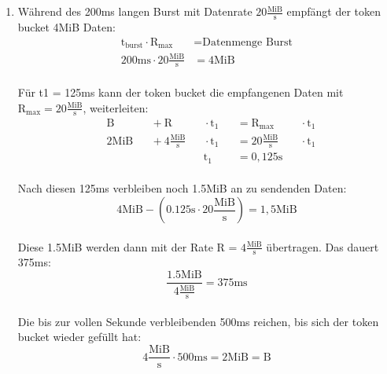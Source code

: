 \documentclass[a4paper,
			llpt,
			solution,
			accentcolor=tud2d,
			colorbacktitle
			]
			{tudexercise}
\newcommand{\MiBs}{\frac{\mathrm{MiB}}{\mathrm{s}}}
\begin{document}
\section{}
\begin{enumerate}
\item
\begin{multicols}{2}
Während des 200ms langen Burst mit Datenrate $20\MiBs$ empfängt der token bucket 4MiB Daten: 
\begin{align*}
\text{t}_\text{burst}  \cdot \text{R}_\text{max} &= \text{Datenmenge Burst}
\\
200\mathrm{ms} \cdot 20\MiBs &= \mathrm{4MiB}
\end{align*}\\
Für t1 = 125ms kann der token bucket die empfangenen Daten mit $\mathrm{R}_{\mathrm{max}} = 20\MiBs$, weiterleiten:
\begin{alignat*}{5}
&\mathrm{B}     &&{}+ \mathrm{R} &&{}\cdot  \mathrm{t}_1 &&{}= \mathrm{R}_{\mathrm{max}} &&{}\cdot  \mathrm{t}_1 \\ 
& 2\mathrm{MiB} &&{}+ 4\MiBs &&{}\cdot   \mathrm{t}_1 &&{}= 20\MiBs &&{}\cdot  \mathrm{t}_1\\
&               &&{}         &&{}      \mathrm{t}_1 &&{}= 0,125\mathrm{s} &&{}
\end{alignat*}\\
Nach diesen 125ms verbleiben noch 1.5MiB an zu sendenden Daten:
$$4\mathrm{MiB} - \left(0.125\mathrm{s} \cdot 20\MiBs\right) = 1,5 \mathrm{MiB}$$\\
Diese 1.5MiB werden dann mit der Rate R = $4\MiBs
$
übertragen. Das dauert 375ms:
$$
\frac{1.5 \mathrm{MiB}}{ 4 \MiBs} = 375\mathrm{ms}
$$\\
Die bis zur vollen Sekunde verbleibenden 500ms reichen, bis sich der token bucket wieder gefüllt hat: 
$$
4\MiBs \cdot 500\mathrm{ms} = 2\mathrm{MiB} = \mathrm{B}
$$
\vfill
\columnbreak


\end{multicols}
\end{enumerate}
\end{document}

